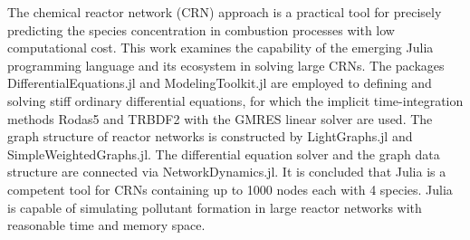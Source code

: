 The chemical reactor network (CRN) approach is a practical tool for precisely predicting the species concentration in combustion processes with low computational cost. This work examines the capability of the emerging Julia programming language and its ecosystem in solving large CRNs. The packages DifferentialEquations.jl and ModelingToolkit.jl are employed to defining and solving stiff ordinary differential equations, for which the implicit time-integration methods Rodas5 and TRBDF2 with the GMRES linear solver are used. The graph structure of reactor networks is constructed by LightGraphs.jl and SimpleWeightedGraphs.jl. The differential equation solver and the graph data structure are connected via NetworkDynamics.jl. It is concluded that Julia is a competent tool for CRNs containing up to 1000 nodes each with 4 species. Julia is capable of simulating pollutant formation in large reactor networks with reasonable time and memory space.